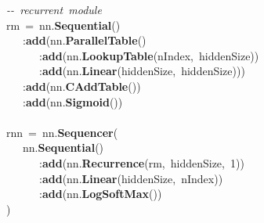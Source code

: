 \noindent
\mbox{}\textit{-\/-\ recurrent\ module} \\
\mbox{}rm\ =\ nn.\textbf{Sequential}() \\
\mbox{}\ \ \ :\textbf{add}(nn.\textbf{ParallelTable}() \\
\mbox{}\ \ \ \ \ \ :\textbf{add}(nn.\textbf{LookupTable}(nIndex,\ hiddenSize)) \\
\mbox{}\ \ \ \ \ \ :\textbf{add}(nn.\textbf{Linear}(hiddenSize,\ hiddenSize))) \\
\mbox{}\ \ \ :\textbf{add}(nn.\textbf{CAddTable}()) \\
\mbox{}\ \ \ :\textbf{add}(nn.\textbf{Sigmoid}()) \\
\mbox{} \\
\mbox{}rnn\ =\ nn.\textbf{Sequencer}( \\
\mbox{}\ \ \ nn.\textbf{Sequential}() \\
\mbox{}\ \ \ \ \ \ :\textbf{add}(nn.\textbf{Recurrence}(rm,\ hiddenSize,\ 1)) \\
\mbox{}\ \ \ \ \ \ :\textbf{add}(nn.\textbf{Linear}(hiddenSize,\ nIndex)) \\
\mbox{}\ \ \ \ \ \ :\textbf{add}(nn.\textbf{LogSoftMax}()) \\
\mbox{})
